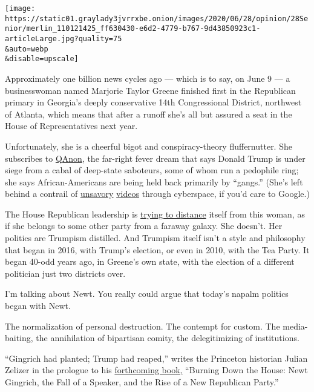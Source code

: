 \texttt{[image: https://static01.graylady3jvrrxbe.onion/images/2020/06/28/opinion/28Senior/merlin\_110121425\_ff630430-e6d2-4779-b767-9d43850923c1-articleLarge.jpg?quality=75\\\&auto=webp\\\&disable=upscale]}

Approximately one billion news cycles ago --- which is to say, on June 9
--- a businesswoman named Marjorie Taylor Greene finished first in the
Republican primary in Georgia's deeply conservative 14th Congressional
District, northwest of Atlanta, which means that after a runoff she's
all but assured a seat in the House of Representatives next year.

Unfortunately, she is a cheerful bigot and conspiracy-theory
fluffernutter. She subscribes to
\href{https://www.nytimes3xbfgragh.onion/2020/06/18/us/politics/qanon-candidates.html?searchResultPosition=1}{QAnon},
the far-right fever dream that says Donald Trump is under siege from a
cabal of deep-state saboteurs, some of whom run a pedophile ring; she
says African-Americans are being held back primarily by ``gangs.''
(She's left behind a contrail of
\href{https://www.youtube.com/watch?v=2rtYok4fdbQ\&feature=youtu.be}{unsavory}
\href{https://www.politico.com/news/2020/06/17/house-republicans-condemn-gop-candidate-racist-videos-325579}{videos}
through cyberspace, if you'd care to Google.)

The House Republican leadership is
\href{https://www.nytimes3xbfgragh.onion/2020/06/17/us/marjorie-taylor-greene-georgia.html}{trying
to distance} itself from this woman, as if she belongs to some other
party from a faraway galaxy. She doesn't. Her politics are Trumpism
distilled. And Trumpism itself isn't a style and philosophy that began
in 2016, with Trump's election, or even in 2010, with the Tea Party. It
began 40-odd years ago, in Greene's own state, with the election of a
different politician just two districts over.

I'm talking about Newt. You really could argue that today's napalm
politics began with Newt.

The normalization of personal destruction. The contempt for custom. The
media-baiting, the annihilation of bipartisan comity, the delegitimizing
of institutions.

``Gingrich had planted; Trump had reaped,'' writes the Princeton
historian Julian Zelizer in the prologue to his
\href{https://www.nytimes3xbfgragh.onion/2020/06/24/books/new-july-books.html}{forthcoming
book,} ``Burning Down the House: Newt Gingrich, the Fall of a Speaker,
and the Rise of a New Republican Party.''

